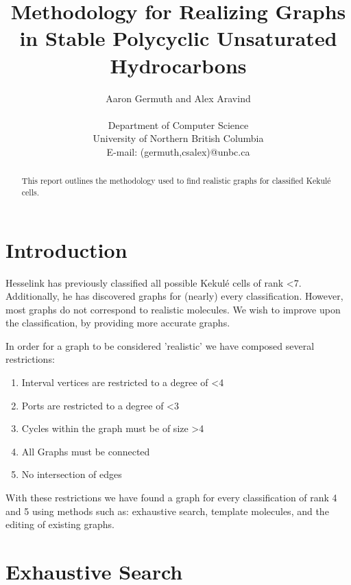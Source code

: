 \documentclass[12pt]{article}
\begin{document}
\title{Methodology for Realizing Graphs in Stable Polycyclic Unsaturated Hydrocarbons}
\author{Aaron Germuth and Alex Aravind \\\\  
Department of Computer Science \\
University of Northern British Columbia \\
E-mail: (germuth,csalex)@unbc.ca}
\maketitle


\begin{abstract}

This report outlines the methodology used to find realistic graphs for classified Kekul\'{e} cells.

\end{abstract}

\section{Introduction}

Hesselink \cite{H13} has previously classified all possible Kekul\'{e} cells of rank \textless  7. Additionally, he has discovered graphs for (nearly) every classification. However, most graphs do not correspond to realistic molecules. We wish to improve upon the classification, by providing more accurate graphs.

In order for a graph to be considered 'realistic' we have composed several restrictions:
\begin{enumerate}
\item Interval vertices are restricted to a degree of \textless 4
\item Ports are restricted to a degree of \textless 3
\item Cycles within the graph must be of size \textgreater 4
\item All Graphs must be connected
\item No intersection of edges
\end{enumerate}

With these restrictions we have found a graph for every classification of rank 4 and 5 using methods such as: exhaustive search, template molecules, and the editing of existing graphs. 

\section{Exhaustive Search}
\end{document}
